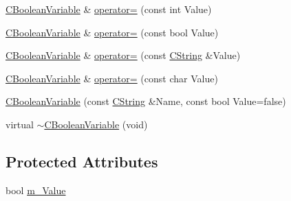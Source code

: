 \begin{DoxyCompactItemize}
\item 
\hyperlink{classCBooleanVariable}{C\-Boolean\-Variable} \& \hyperlink{classCBooleanVariable_a98ff04b706738d9b760ed682ad01ead7}{operator=} (const int Value)
\item 
\hyperlink{classCBooleanVariable}{C\-Boolean\-Variable} \& \hyperlink{classCBooleanVariable_a11c8041248147e45d551c35ac87347e1}{operator=} (const bool Value)
\item 
\hyperlink{classCBooleanVariable}{C\-Boolean\-Variable} \& \hyperlink{classCBooleanVariable_a824c2327fe446efe041e1688aea7b4af}{operator=} (const \hyperlink{classCString}{C\-String} \&Value)
\item 
\hyperlink{classCBooleanVariable}{C\-Boolean\-Variable} \& \hyperlink{classCBooleanVariable_a05ab1b8170a3515404218bac2cfd1b97}{operator=} (const char Value)
\item 
\hyperlink{classCBooleanVariable_a25df44d1ba844180a628b450cc2848b6}{C\-Boolean\-Variable} (const \hyperlink{classCString}{C\-String} \&Name, const bool Value=false)
\item 
virtual \hyperlink{classCBooleanVariable_ad8ce4d60d3467385816768bc0323badb}{$\sim$\-C\-Boolean\-Variable} (void)
\end{DoxyCompactItemize}
\subsection*{Protected Attributes}
\begin{DoxyCompactItemize}
\item 
bool \hyperlink{classCBooleanVariable_a768531fa3007ef064cd33bdd68a4c5b5}{m\-\_\-\-Value}
\end{DoxyCompactItemize}


